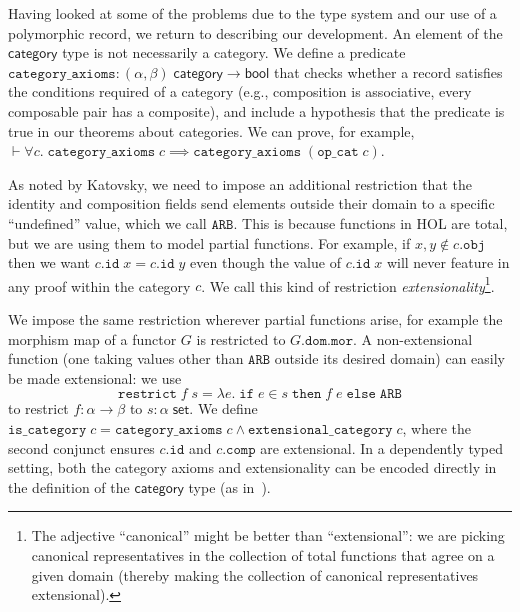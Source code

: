 \documentclass[twoside,titlepage,11pt]{article}
\begin{document}
Having looked at some of the problems due to the type system and our use of a polymorphic record, we return to describing our development.
An element of the $\mathsf{category}$ type is not necessarily a category.
We define a predicate $\mathtt{category\_axioms}:(\alpha,\beta)\;\mathsf{category}\to\mathsf{bool}$ that checks whether a record satisfies the conditions required of a category (e.g., composition is associative, every composable pair has a composite), and include a hypothesis that the predicate is true in our theorems about categories.
We can prove, for example, $\vdash\forall{c}.\;\mathtt{category\_axioms}\;c\implies\mathtt{category\_axioms}\;(\mathtt{op\_cat}\;c)$.

As noted by Katovsky, we need to impose an additional restriction that the identity and composition fields send elements outside their domain to a specific ``undefined'' value, which we call $\mathtt{ARB}$.
This is because functions in HOL are total, but we are using them to model partial functions.
For example, if $x,y\notin c.\mathtt{obj}$ then we want $c.\mathtt{id}\;x=c.\mathtt{id}\;y$ even though the value of $c.\mathtt{id}\;x$ will never feature in any proof within the category $c$.
We call this kind of restriction \emph{extensionality}\footnote{The adjective ``canonical'' might be better than ``extensional'': we are picking canonical representatives in the collection of total functions that agree on a given domain (thereby making the collection of canonical representatives extensional).}.

We impose the same restriction wherever partial functions arise, for example the morphism map of a functor $G$ is restricted to $G.\mathtt{dom}.\mathtt{mor}$.
A non-extensional function (one taking values other than $\mathtt{ARB}$ outside its desired domain) can easily be made extensional: we use $$\mathtt{restrict}\;f\;s=\lambda{e}.\;\mathtt{if}\;e\in s\;\mathtt{then}\;f\;e\;\mathtt{else}\;\mathtt{ARB}$$ to restrict $f:\alpha\to\beta$ to $s:\alpha\;\mathsf{set}$.
We define $\mathtt{is\_category}\;c=\mathtt{category\_axioms}\;c\land\mathtt{extensional\_category}\;c$, where the second conjunct ensures $c.\mathtt{id}$ and $c.\mathtt{comp}$ are extensional.
In a dependently typed setting, both the category axioms and extensionality can be encoded directly in the definition of the $\mathsf{category}$ type (as in~\cite{DBLP:conf/birthday/HuetS00,Sozeau,Megacz}).
\end{document}
